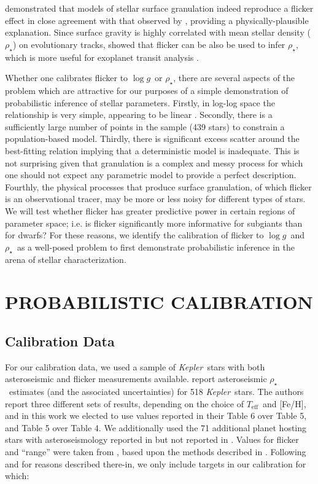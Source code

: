 \documentclass[apjl]{emulateapj}
\newcommand{\logg}{$\log g$}
\newcommand{\rhostar}{$\rho_{\star}$}
\newcommand{\Teff}{$T_{\mathrm{eff}}$}
\newcommand{\FeH}{[Fe/H]}
\newcommand{\Kepler}{\textit{Kepler}}
\begin{document}
\citet{cranmer:2014} demonstrated that models of stellar surface granulation
indeed reproduce a flicker effect in close agreement with that observed by
\citet{bastien:2013}, providing a physically-plausible explanation.
Since surface gravity is highly correlated with mean stellar density (\rhostar)
on evolutionary tracks, \citet{kipping:2014} showed that flicker can be also
be used to infer \rhostar, which is more useful for exoplanet transit analysis
\citep{seager:2003}.

Whether one calibrates flicker to \logg\ or \rhostar, there are several aspects
of the problem which are attractive for our purposes of a simple demonstration
of probabilistic inference of stellar parameters.
Firstly, in log-log space the relationship is very simple, appearing to be
linear \citep{kipping:2014}.
Secondly, there is a sufficiently large number of points in the sample (439
stars) to constrain a population-based model.
Thirdly, there is significant excess scatter around the best-fitting relation
implying that a deterministic model is inadequate.
This is not surprising given that granulation is a complex and messy process
for which one should not expect any parametric model to provide a perfect
description.
Fourthly, the physical processes that produce surface granulation, of which
flicker is an observational tracer, may be more or less noisy for different
types of stars.
We will test whether flicker has greater predictive power in certain regions
of parameter space; i.e. is flicker significantly more informative for
subgiants than for dwarfs?
For these reasons, we identify the calibration of
flicker to \logg\ and \rhostar\ as a well-posed problem to first demonstrate
probabilistic inference in the arena of stellar characterization.

\section{PROBABILISTIC CALIBRATION}
\label{sec:HBM}


\subsection{Calibration Data}

For our calibration data, we used a sample of \Kepler\ stars with
both asteroseismic and flicker measurements available. \citet{chaplin:2014}
report asteroseismic \rhostar\ estimates (and the associated uncertainties) for
518 \Kepler\ stars. The authors report three different sets of results,
depending on the choice of \Teff\ and \FeH, and in this work we elected to use
values reported in their Table 6 over Table 5, and Table 5 over Table 4. We
additionally used the 71 additional planet hosting stars with asteroseismology
reported in \citet{huber:2013} but not reported in \citet{chaplin:2014}. Values
for flicker and ``range'' were taken from \citet{kipping:2014}, based upon the
methods described in \citet{bastien:2013}. Following \citet{kipping:2014} and
for reasons described there-in, we only include targets in our calibration for
which:
\end{document}
